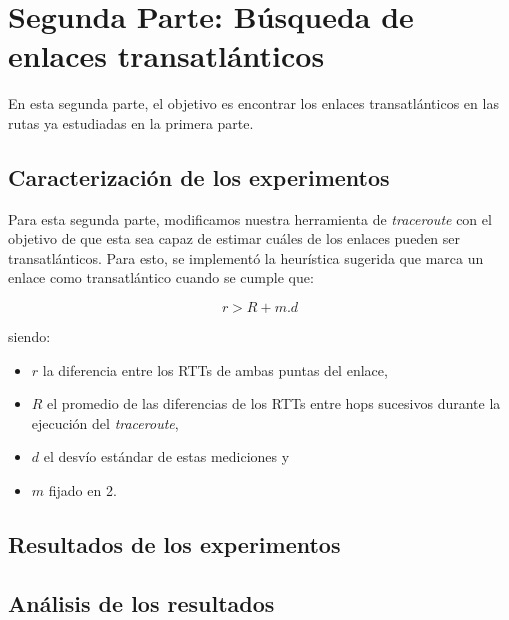 \section{Segunda Parte: Búsqueda de enlaces transatlánticos}
En esta segunda parte, el objetivo es encontrar los enlaces transatlánticos en
las rutas ya estudiadas en la primera parte.

\subsection{Caracterización de los experimentos}
Para esta segunda parte, modificamos nuestra herramienta de \emph{traceroute}
con el objetivo de que esta sea capaz de estimar cuáles de los enlaces pueden
ser transatlánticos. Para esto, se implementó la heurística sugerida que marca
un enlace como transatlántico cuando se cumple que:

$$r > R + m.d$$

siendo:
\begin{itemize}
    \item $r$ la diferencia entre los RTTs de ambas puntas del enlace,
    \item $R$ el promedio de las diferencias de los RTTs entre hops sucesivos
        durante la ejecución del \emph{traceroute},
    \item $d$ el desvío estándar de estas mediciones y
    \item $m$ fijado en 2.
\end{itemize}

\subsection{Resultados de los experimentos}

\subsection{Análisis de los resultados}

